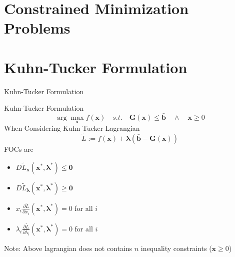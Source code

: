 \documentclass[a4paper,11pt]{article}
\newcommand{\bd}{\mathbf}
\newcommand{\p}{\partial}
\begin{document}
\section{Constrained Minimization Problems} %
\label{sec:constrained_minimization_problems}

\section{Kuhn-Tucker Formulation} %
\label{sec:kuhn_tucker_formulation}
\begin{frame}[t]{Kuhn-Tucker Formulation}
	\begin{block}
		{Kuhn-Tucker Formulation}
		\[
			\arg\max_\bd{x} f(\bd{x}) \quad s.t.\quad \bd{G}(\bd{x})\le \bar{\bd{b}} \quad\land\quad \bd{x}\ge 0
		\] When Considering Kuhn-Tucker Lagrangian\[
			\tilde{L}:=f(\bd{x})+\bd{\lambda}(\bar{\bd{b}}-\bd{G}(\bd{x}))
		\]
		FOCs are
		\begin{itemize}
			\item $D\tilde{L}_{\bd{x}}(\bd{x^\ast},\bd{\lambda^\ast})\le \bd{0}$
			\item $D\tilde{L}_{\bd{\lambda}}(\bd{x^\ast},\bd{\lambda^\ast})\ge \bd{0}$
			\item $x_i \frac{\p \tilde L}{\p x_i}(\bd{x^\ast,\lambda^\ast})=0$ for all $i$
			\item $\lambda_i \frac{\p \tilde L}{\p \lambda_i}(\bd{x^\ast,\lambda^\ast})=0$ for all $i$
		\end{itemize}
	\end{block}
	Note: Above lagrangian does not contains $n$ inequality constraints ($\bd{x}\ge 0$)
\end{frame}
\end{document}
